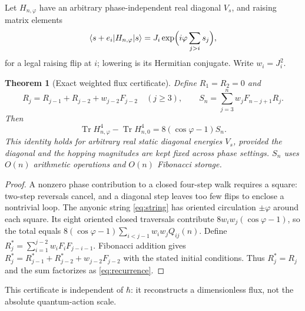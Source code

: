 \documentclass[10pt,a4paper]{article}
\newtheorem{theorem}{Theorem}[section]
\newcommand{\Tr}{\operatorname{Tr}}
\begin{document}
Let $H_{n,\varphi}$ have an arbitrary phase-independent real diagonal $V_s$, and raising matrix elements
\begin{equation}\label{eq:string}
\langle s+e_i|H_{n,\varphi}|s\rangle
=J_i\exp\Bigl(i\varphi\sum_{j>i}s_j\Bigr),
\end{equation}
for a legal raising flip at $i$; lowering is its Hermitian conjugate. Write $w_i=J_i^2$.
\begin{theorem}[Exact weighted flux certificate]\label{th:flux}
Define $R_1=R_2=0$ and
\begin{equation}\label{eq:recurrence}
R_j=R_{j-1}+R_{j-2}+w_{j-2}F_{j-2}\quad(j\ge3),\qquad
S_n=\sum_{j=3}^n w_jF_{n-j+1}R_j.
\end{equation}
Then
\begin{equation}\label{eq:flux}
\boxed{\Tr H_{n,\varphi}^{4}-\Tr H_{n,0}^{4}
=8(\cos\varphi-1) S_n.}
\end{equation}
This identity holds for arbitrary real static diagonal energies $V_s$, provided the diagonal and the hopping magnitudes are kept fixed across phase settings. $S_n$ uses $O(n)$ arithmetic operations and $O(n)$ Fibonacci storage.
\end{theorem}
\begin{proof}
A nonzero phase contribution to a closed four-step walk requires a square: two-step reversals cancel, and a diagonal step leaves too few flips to enclose a nontrivial loop. The anyonic string \eqref{eq:string} has oriented circulation $\pm\varphi$ around each square. Its eight oriented closed traversals contribute $8w_iw_j(\cos\varphi-1)$, so the total equals $8(\cos\varphi-1)\sum_{i<j-1}w_iw_j Q_{ij}(n)$. Define
$R_j^*=\sum_{i=1}^{j-2}w_iF_i F_{j-i-1}$.
Fibonacci addition gives $R_j^*=R_{j-1}^*+R_{j-2}^*+w_{j-2}F_{j-2}$ with the stated initial conditions. Thus $R_j^*=R_j$ and the sum factorizes as \eqref{eq:recurrence}.
\end{proof}
This certificate is independent of $\hbar$: it reconstructs a dimensionless flux, not the absolute quantum-action scale.
\end{document}
